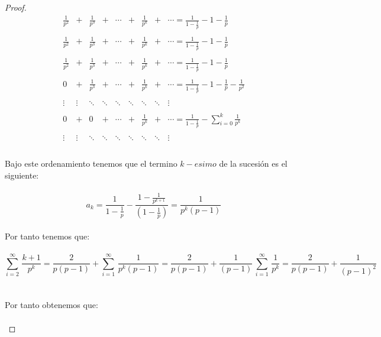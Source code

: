 \documentclass[11pt,letterpaper]{article}
\begin{document}
\begin{proof}
\,\\
\begin{equation*}
\begin{matrix}
    \frac{1}{p^2}&+&\frac{1}{p^3}&+&\cdots&+&\frac{1}{p^k}&+&\cdots=\frac{1}{1-\frac{1}{p}}-1-\frac{1}{p}\\
    \,\\
    \frac{1}{p^2}&+&\frac{1}{p^3}&+&\cdots&+&\frac{1}{p^k}&+&\cdots=\frac{1}{1-\frac{1}{p}}-1-\frac{1}{p}\\
    \,\\
    \frac{1}{p^2}&+&\frac{1}{p^3}&+&\cdots&+&\frac{1}{p^k}&+&\cdots=\frac{1}{1-\frac{1}{p}}-1-\frac{1}{p}\\
    \,\\
    0&+&\frac{1}{p^3}&+&\cdots&+&\frac{1}{p^k}&+&\cdots=\frac{1}{1-\frac{1}{p}}-1-\frac{1}{p}-\frac{1}{p^2}\\
    \,\\
    \vdots & \vdots & \ddots & \ddots &\ddots &\ddots &\ddots &\ddots &\vdots\\
    \,\\
    0&+&0&+&\cdots&+& \frac{1}{p^k}&+&\cdots=\frac{1}{1-\frac{1}{p}}-\sum_{i=0}^{k}\frac{1}{p^k}\\
    \,\\
     \vdots & \vdots & \ddots & \ddots &\ddots &\ddots &\ddots &\ddots &\vdots\\
\end{matrix}
\end{equation*}\,\\
Bajo este ordenamiento tenemos que el termino $k-esimo$ de la sucesi\'on es el siguiente:\,\\
\,\\
\begin{equation*}
    a_k=\frac{1}{1-\frac{1}{p}}-\frac{1-\frac{1}{p^{k+1}}}{(1-\frac{1}{p})}=\frac{1}{p^k(p-1)}
\end{equation*}\,\\
Por tanto tenemos que:\,\\
\,\\
\begin{equation*}
    \sum_{i=2}^{\infty}\,\frac{k+1}{p^k}=\frac{2}{p(p-1)}+\sum_{i=1}^{\infty}\,\frac{1}{p^k(p-1)}=\frac{2}{p(p-1)}+\frac{1}{(p-1)}\,\sum_{i=1}^{\infty}\,\frac{1}{p^k}=\frac{2}{p(p-1)}+\frac{1}{(p-1)^2}
\end{equation*}\,\\
 \,\\
Por tanto obtenemos que:\,\\
\,\\

\end{proof}
\end{document}
